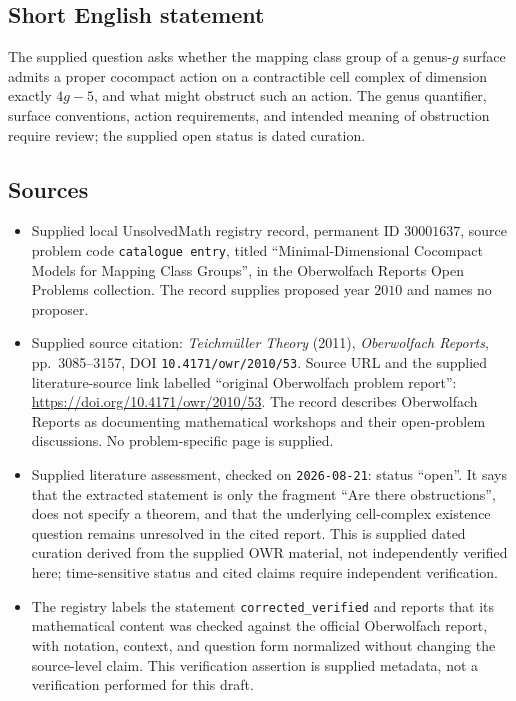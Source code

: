 \documentclass[11pt]{article}
\begin{document}
\subsection{Short English statement}
The supplied question asks whether the mapping class group of a genus-\(g\) surface admits a proper cocompact action on a contractible cell complex of dimension exactly \(4g-5\), and what might obstruct such an action. The genus quantifier, surface conventions, action requirements, and intended meaning of obstruction require review; the supplied open status is dated curation.
\subsection{Sources}
\begin{itemize}
\item Supplied local UnsolvedMath registry record, permanent ID \(30001637\), source problem code \texttt{catalogue entry}, titled ``Minimal-Dimensional Cocompact Models for Mapping Class Groups'', in the Oberwolfach Reports Open Problems collection. The record supplies proposed year \(2010\) and names no proposer.
\item Supplied source citation: \emph{Teichmüller Theory} (2011), \emph{Oberwolfach Reports}, pp.~3085--3157, DOI \texttt{10.4171/owr/2010/53}. Source URL and the supplied literature-source link labelled ``original Oberwolfach problem report'': \url{https://doi.org/10.4171/owr/2010/53}. The record describes Oberwolfach Reports as documenting mathematical workshops and their open-problem discussions. No problem-specific page is supplied.
\item Supplied literature assessment, checked on \texttt{2026-08-21}: status ``open''. It says that the extracted statement is only the fragment ``Are there obstructions'', does not specify a theorem, and that the underlying cell-complex existence question remains unresolved in the cited report. This is supplied dated curation derived from the supplied OWR material, not independently verified here; time-sensitive status and cited claims require independent verification.
\item The registry labels the statement \texttt{corrected\_verified} and reports that its mathematical content was checked against the official Oberwolfach report, with notation, context, and question form normalized without changing the source-level claim. This verification assertion is supplied metadata, not a verification performed for this draft.
\end{itemize}
\end{document}
